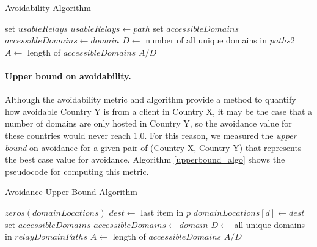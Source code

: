 \begin{algorithm}[t]
\caption{Avoidability Algorithm}
\label{avoid_algo}
\small
\begin{algorithmic}[1]
    \State set $usableRelays$
		\State $usableRelays \gets path$
	\EndIf
    \EndFor
    \State set $accessibleDomains$
        \State $accessibleDomains \gets domain$
        \EndIf
    \EndIf
    \EndFor
    \State $D \gets$ number of all unique domains in $paths2$
    \State $A \gets$ length of $accessibleDomains$
    \State \Return $A / D$
\EndFunction
\end{algorithmic}
\end{algorithm}


\paragraph{Upper bound on avoidability.}  Although the avoidability
metric and algorithm provide a method to quantify how avoidable Country
Y is from a client in Country X, it may be the case that a number of
domains are only hosted in Country Y, so the avoidance value for these
countries would never reach 1.0.  For this reason, we measured the {\em upper
bound} on avoidance for a given pair of (Country X, Country Y) that
represents the best case value for avoidance.  
Algorithm \ref{upperbound_algo} shows the pseudocode for computing this metric.

\begin{algorithm}[t]
\caption{Avoidance Upper Bound Algorithm}
\label{upperbound_algo}
\small
\begin{algorithmic}[1]
    \State $zeros(domainLocations)$
		\State $dest \gets $ last item in $p$
		\State $domainLocations[d] \gets dest$
    \EndFor
    \State set $accessibleDomains$
    \State $accessibleDomains \gets domain$
    \EndIf
    \EndFor
    \State $D \gets$ all unique domains in  $relayDomainPaths$
    \State $A \gets$ length of $accessibleDomains$
    \State \Return $A / D$
\EndFunction
\end{algorithmic}
\end{algorithm}

